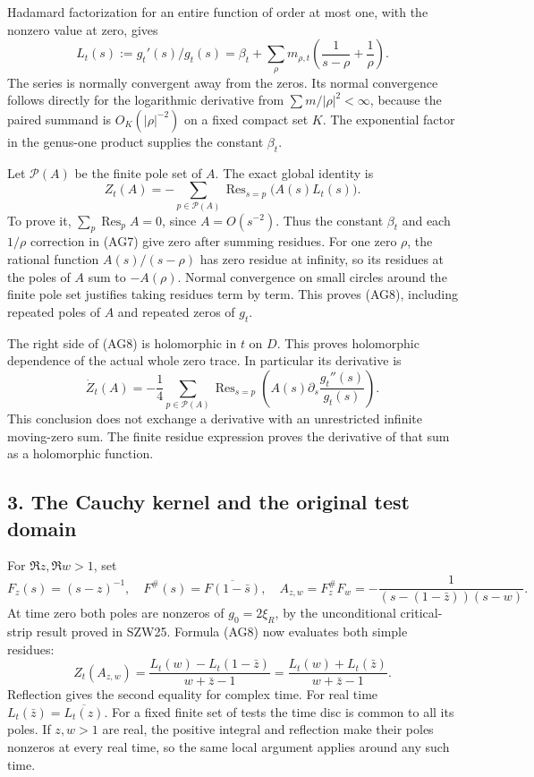 \documentclass[
  10pt,
  a4paper,
]{article}
\begin{document}
Hadamard factorization for an entire function of order at most one, with
the nonzero value at zero, gives \[
L_t(s):=g_t'(s)/g_t(s)
=\beta_t+\sum_\rho m_{\rho,t}
\left(\frac1{s-\rho}+\frac1\rho\right).
\tag{AG7}
\] The series is normally convergent away from the zeros. Its normal
convergence follows directly for the logarithmic derivative from
\(\sum m/|\rho|^2<\infty\), because the paired summand is
\(O_K(|\rho|^{-2})\) on a fixed compact set \(K\). The exponential
factor in the genus-one product supplies the constant \(\beta_t\).

Let \(\mathcal P(A)\) be the finite pole set of \(A\). The exact global
identity is \[
\boxed{Z_t(A)=-\sum_{p\in\mathcal P(A)}
\operatorname{Res}_{s=p}\bigl(A(s)L_t(s)\bigr).}
\tag{AG8}
\] To prove it, \(\sum_p\operatorname{Res}_pA=0\), since
\(A=O(s^{-2})\). Thus the constant \(\beta_t\) and each \(1/\rho\)
correction in (AG7) give zero after summing residues. For one zero
\(\rho\), the rational function \(A(s)/(s-\rho)\) has zero residue at
infinity, so its residues at the poles of \(A\) sum to \(-A(\rho)\).
Normal convergence on small circles around the finite pole set justifies
taking residues term by term. This proves (AG8), including repeated
poles of \(A\) and repeated zeros of \(g_t\).

The right side of (AG8) is holomorphic in \(t\) on \(D\). This proves
holomorphic dependence of the actual whole zero trace. In particular its
derivative is \[
\dot Z_t(A)=-\frac14\sum_{p\in\mathcal P(A)}
\operatorname{Res}_{s=p}\left(A(s)\partial_s\frac{g_t''(s)}{g_t(s)}\right).
\tag{AG9}
\] This conclusion does not exchange a derivative with an unrestricted
infinite moving-zero sum. The finite residue expression proves the
derivative of that sum as a holomorphic function.

\subsection{3. The Cauchy kernel and the original test
domain}\label{the-cauchy-kernel-and-the-original-test-domain}

For \(\Re z,\Re w>1\), set \[
F_z(s)=(s-z)^{-1},\quad F^\#(s)=\overline{F(1-\bar s)},\quad
A_{z,w}=F_z^\#F_w=-\frac1{(s-(1-\bar z))(s-w)}.
\tag{AG10}
\] At time zero both poles are nonzeros of \(g_0=2\xi_R\), by the
unconditional critical-strip result proved in SZW25. Formula (AG8) now
evaluates both simple residues: \[
Z_t(A_{z,w})=
\frac{L_t(w)-L_t(1-\bar z)}{w+\bar z-1}
=\frac{L_t(w)+L_t(\bar z)}{w+\bar z-1}.
\tag{AG11}
\] Reflection gives the second equality for complex time. For real time
\(L_t(\bar z)=\overline{L_t(z)}\). For a fixed finite set of tests the
time disc is common to all its poles. If \(z,w>1\) are real, the
positive integral and reflection make their poles nonzeros at every real
time, so the same local argument applies around any such time.
\end{document}
